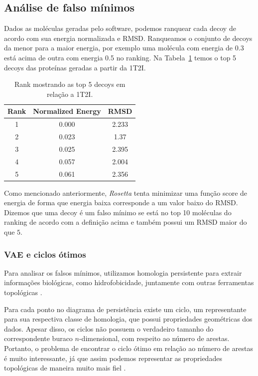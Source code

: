 \subsection{Análise de falso mínimos}
Dados as moléculas geradas pelo software, podemos ranquear cada decoy de acordo com sua energia normalizada
e RMSD. Ranqueamos o conjunto de decoys da menor para a maior energia, por exemplo uma molécula com energia
de 0.3 está acima de outra com energia 0.5 no ranking. Na Tabela~\ref{tab:protrank} temos o top 5 decoys
das proteínas geradas a partir da 1T2I.

\begin{table}[!htbp]
    \centering
    \caption{Rank mostrando as top 5 decoys em relação a 1T2I.}
    \label{tab:protrank}
    \begin{tabular}{@{}ccc@{}}
        \toprule
        Rank & Normalized Energy & RMSD  \\
        \midrule
        1    & 0.000             & 2.233 \\
        2    & 0.023             & 1.37  \\
        3    & 0.025             & 2.395 \\
        4    & 0.057             & 2.004 \\
        5    & 0.061             & 2.356 \\
        \bottomrule
    \end{tabular}
\end{table}

Como mencionado anteriormente, \textit{Rosetta} tenta minimizar uma função score de energia de forma
que energia baixa corresponde a um valor baixo do RMSD. Dizemos que uma decoy é um falso mínimo
se está no top 10 moléculas do ranking de acordo com a definição acima e também possui um RMSD maior
do que $5$.

\subsubsection{VAE e ciclos ótimos}

Para analisar os falsos mínimos, utilizamos homologia persistente \cite{Edelsbrunner2002} para extrair
informações biológicas, como hidrofobicidade, juntamente com outras ferramentas topológicas \cite{Cang2017}.

Para cada ponto no diagrama de persistência existe um ciclo, um representante para sua respectiva classe
de homologia, que possui propriedades geométricas dos dados. Apesar disso, os ciclos não possuem o
verdadeiro tamanho do correspondente buraco $n$-dimensional, com respeito ao número de arestas. Portanto,
o problema de encontrar o ciclo ótimo em relação ao número de arestas é muito interessante, já que assim
podemos representar as propriedades topológicas de maneira muito mais fiel \cite{Escolar2015}.

